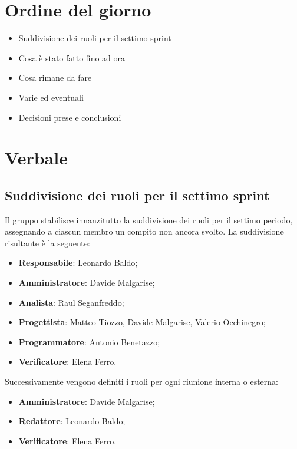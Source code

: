 \documentclass[italian,12pt]{article}
\begin{document}
\section{Ordine del giorno}
\begin{itemize}
	\item Suddivisione dei ruoli per il settimo sprint
	\item Cosa è stato fatto fino ad ora
	\item Cosa rimane da fare
	\item Varie ed eventuali
	\item Decisioni prese e conclusioni
\end{itemize}

\newpage

\section{Verbale}
\subsection{Suddivisione dei ruoli per il settimo sprint}
Il gruppo stabilisce innanzitutto la suddivisione dei ruoli per il settimo periodo, assegnando a ciascun membro un compito non ancora svolto. La suddivisione risultante è la seguente:
\begin{itemize}
	\item \textbf{Responsabile}: Leonardo Baldo;
	\item \textbf{Amministratore}: Davide Malgarise;
	\item \textbf{Analista}: Raul Seganfreddo;
	\item \textbf{Progettista}: Matteo Tiozzo, Davide Malgarise, Valerio Occhinegro;
	\item \textbf{Programmatore}: Antonio Benetazzo;
	\item \textbf{Verificatore}: Elena Ferro.
\end{itemize}
Successivamente vengono definiti i ruoli per ogni riunione interna o esterna:
\begin{itemize}
	\item \textbf{Amministratore}: Davide Malgarise;
	\item \textbf{Redattore}: Leonardo Baldo;
	\item \textbf{Verificatore}: Elena Ferro.
\end{itemize}
\end{document}
